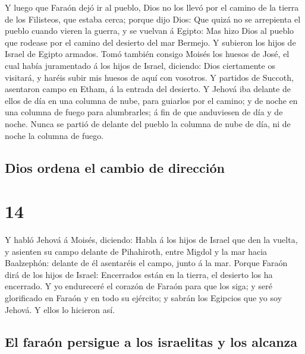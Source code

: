  Y luego que Faraón dejó ir al pueblo, Dios no los llevó
por el camino de la tierra de los Filisteos, que estaba cerca; porque
dijo Dios: Que quizá no se arrepienta el pueblo cuando vieren la guerra,
y se vuelvan á Egipto:  Mas hizo Dios al pueblo que rodease
por el camino del desierto del mar Bermejo. Y subieron los hijos de
Israel de Egipto armados.  Tomó también consigo Moisés los
huesos de José, el cual había juramentado á los hijos de Israel,
diciendo: Dios ciertamente os visitará, y haréis subir mis huesos de
aquí con vosotros.  Y partidos de Succoth, asentaron campo
en Etham, á la entrada del desierto.  Y Jehová iba delante
de ellos de día en una columna de nube, para guiarlos por el camino; y
de noche en una columna de fuego para alumbrarles; á fin de que
anduviesen de día y de noche.  Nunca se partió de delante
del pueblo la columna de nube de día, ni de noche la columna de fuego.

\hypertarget{dios-ordena-el-cambio-de-direcciuxf3n}{%
\subsection{Dios ordena el cambio de
dirección}\label{dios-ordena-el-cambio-de-direcciuxf3n}}

\hypertarget{section-13}{%
\section{14}\label{section-13}}

 Y habló Jehová á Moisés, diciendo:  Habla á los
hijos de Israel que den la vuelta, y asienten su campo delante de
Pihahiroth, entre Migdol y la mar hacia Baalzephón: delante de él
asentaréis el campo, junto á la mar.  Porque Faraón dirá de
los hijos de Israel: Encerrados están en la tierra, el desierto los ha
encerrado.  Y yo endureceré el corazón de Faraón para que
los siga; y seré glorificado en Faraón y en todo su ejército; y sabrán
los Egipcios que yo soy Jehová. Y ellos lo hicieron así.

\hypertarget{el-farauxf3n-persigue-a-los-israelitas-y-los-alcanza}{%
\subsection{El faraón persigue a los israelitas y los
alcanza}\label{el-farauxf3n-persigue-a-los-israelitas-y-los-alcanza}}

